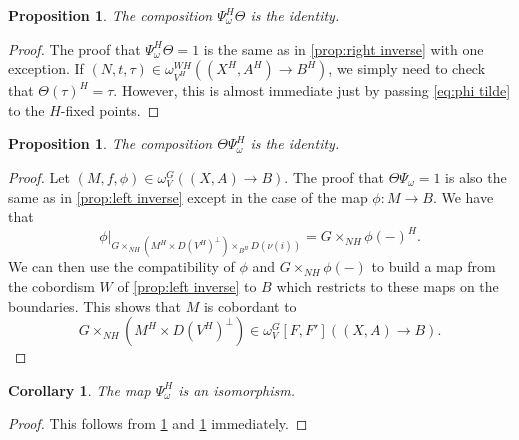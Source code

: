 \documentclass[11pt]{amsart}
\theoremstyle{plain}   %
\newtheorem{cor}[thm]{Corollary}
\newtheorem{prop}[thm]{Proposition}
\theoremstyle{definition}
\theoremstyle{remark}
\numberwithin{equation}{section}
\begin{document}
\begin{prop}\label{prop:psi theta is identity}
The composition $\Psi_\omega^H\Theta$ is the identity.
\end{prop}

\begin{proof}
The proof that $\Psi_\omega^H \Theta=1$ is the same as in \cref{prop:right inverse} with one exception. If $(N,t,\tau)\in\omega_{V^H}^{WH}((X^H,A^H)\to B^H)$, we simply need to check that $\Theta(\tau)^H=\tau$. However, this is almost immediate just by passing \cref{eq:phi tilde} to the $H$-fixed points. 
\end{proof}

\begin{prop}\label{prop:theta psi is identity}
The composition $\Theta\Psi_\omega^H$ is the identity.
\end{prop}

\begin{proof}
Let $(M,f,\phi)\in \omega_V^G((X,A)\to B)$. The proof that $\Theta\Psi_\omega=1$ is also the same as in \cref{prop:left inverse} except in the case of the map $\phi:M\to B$. We have that
\[
\phi|_{G\times_{NH}(M^H\times D(V^H)^\perp)\times_{B^H}D(\nu(i))} = G\times_{NH}\phi(-)^H.
\]
We can then use the compatibility of $\phi$ and $G\times_{NH}\phi(-)$ to build a map from the cobordism $W$ of \cref{prop:left inverse} to $B$ which restricts to these maps on the boundaries. This shows that $M$ is cobordant to
\[
G\times_{NH}(M^H\times D(V^H)^\perp) \in \omega_{V}^G[F,F']((X,A)\to B).
\]
\end{proof}

\begin{cor}\label{cor:eq param geom iso}
The map $\Psi_\omega^H$ is an isomorphism.
\end{cor}
\begin{proof}
This follows from \cref{prop:theta psi is identity} and \cref{prop:psi theta is identity} immediately. 
\end{proof}
\end{document}

